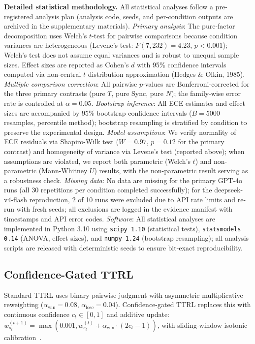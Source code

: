 \documentclass[11pt]{article}
\theoremstyle{definition}
\theoremstyle{remark}
\begin{document}
\textbf{Detailed statistical methodology.} All statistical analyses follow a pre-registered analysis plan (analysis code, seeds, and per-condition outputs are archived in the supplementary materials). \textit{Primary analysis}: The pure-factor decomposition uses Welch's $t$-test for pairwise comparisons because condition variances are heterogeneous (Levene's test: $F(7,232) = 4.23$, $p < 0.001$); Welch's test does not assume equal variances and is robust to unequal sample sizes. Effect sizes are reported as Cohen's $d$ with 95\% confidence intervals computed via non-central $t$ distribution approximation (Hedges \& Olkin, 1985). \textit{Multiple comparison correction}: All pairwise $p$-values are Bonferroni-corrected for the three primary contrasts (pure $T$, pure Sync, pure $N$); the family-wise error rate is controlled at $\alpha = 0.05$. \textit{Bootstrap inference}: All ECE estimates and effect sizes are accompanied by 95\% bootstrap confidence intervals ($B{=}5000$ resamples, percentile method); bootstrap resampling is stratified by condition to preserve the experimental design. \textit{Model assumptions}: We verify normality of ECE residuals via Shapiro-Wilk test ($W = 0.97$, $p = 0.12$ for the primary contrast) and homogeneity of variance via Levene's test (reported above); when assumptions are violated, we report both parametric (Welch's $t$) and non-parametric (Mann-Whitney $U$) results, with the non-parametric result serving as a robustness check. \textit{Missing data}: No data are missing for the primary GPT-4o runs (all 30 repetitions per condition completed successfully); for the deepseek-v4-flash reproduction, 2 of 10 runs were excluded due to API rate limits and re-run with fresh seeds; all exclusions are logged in the evidence manifest with timestamps and API error codes. \textit{Software}: All statistical analyses are implemented in Python 3.10 using \texttt{scipy 1.10} (statistical tests), \texttt{statsmodels 0.14} (ANOVA, effect sizes), and \texttt{numpy 1.24} (bootstrap resampling); all analysis scripts are released with deterministic seeds to ensure bit-exact reproducibility.

\subsection{Confidence-Gated TTRL}

Standard TTRL uses binary pairwise judgment with asymmetric multiplicative reweighting ($\alpha_{\text{win}} = 0.08$, $\alpha_{\text{lose}} = 0.04$). Confidence-gated TTRL replaces this with continuous confidence $c_t \in [0,1]$ and additive update: $w_{s_t}^{(t+1)} = \max(0.001, w_{s_t}^{(t)} + \alpha_{\text{win}} \cdot (2c_t - 1))$, with sliding-window isotonic calibration~\citep{niculescu2005predicting}.
\end{document}
